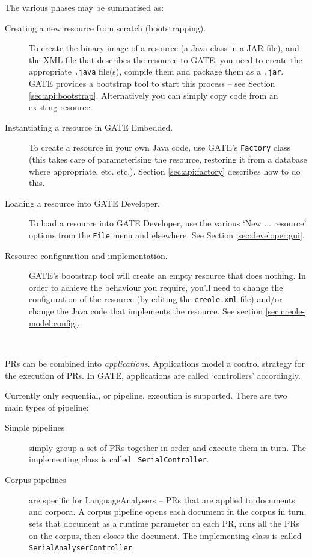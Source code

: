 The various phases may be summarised as:
%
\begin{description}
%
\item[Creating a new resource from scratch (bootstrapping).]
To create the binary image of a resource (a Java class in a JAR file),
and the XML file that describes the resource to GATE, you need to
create the appropriate {\tt .java} file(s), compile them and package
them as a {\tt .jar}. GATE provides a bootstrap tool to
start this process -- see
Section \ref{sec:api:bootstrap}. Alternatively you can simply copy
code from an existing resource.
%
\item[Instantiating a resource in GATE Embedded.]
To create a resource in your own Java code, use GATE's {\tt Factory} class
(this takes care of parameterising the resource, restoring it from a database
where appropriate, etc. etc.). Section \ref{sec:api:factory} describes how
to do this.
%
\item[Loading a resource into GATE Developer.]
To load a resource into GATE Developer, use the various `New
... resource' options from the {\tt File} menu and elsewhere. See
Section
\ref{sec:developer:gui}.
%
\item[Resource configuration and implementation.]
GATE's bootstrap tool will create an empty resource that does nothing. In
order to achieve the behaviour you require, you'll need to change the
configuration of the resource (by editing the {\tt creole.xml} file) and/or
change the Java code that implements the resource. See section
\ref{sec:creole-model:config}.
%
\end{description}
%





\mbox{ }

PRs can be combined into {\em applications}. Applications model a control
strategy for the execution of PRs. In GATE, applications are called
`controllers' accordingly.

Currently only sequential, or pipeline,
execution is supported. There are two main types of pipeline:
%
\begin{description}
%
\item[Simple pipelines] simply group a set of PRs together in order and
execute them in turn. The implementing class is called {\tt
SerialController}.
%
\item[Corpus pipelines] are specific for LanguageAnalysers -- PRs that are
applied to documents and corpora. A corpus pipeline opens each document in
the corpus in turn, sets that document as a runtime parameter on each PR,
runs all the PRs on the corpus, then closes the document.
The implementing class is called {\tt SerialAnalyserController}.
\end{description}

